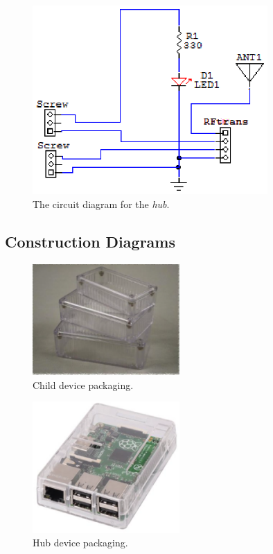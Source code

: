 \documentclass[12pt]{article}
\begin{document}
\begin{figure}[ht!]
\centering %
\includegraphics[width=0.8\textwidth]{CKT-hub.eps} 
\caption{The circuit diagram for the \emph{hub}.} \label{ckt-hub}
\end{figure}

\clearpage

\subsection*{Construction Diagrams}
\begin{figure}[ht!]
\centering %
\includegraphics[width=0.5\textwidth]{child-packaging.eps} 
\caption{Child device packaging. \cite{hammond}} \label{child-pack}
\end{figure}

\begin{figure}[ht!]
\centering %
\includegraphics[width=0.5\textwidth]{hub-packaging.eps} 
\caption{Hub device packaging. \cite{kotek}} \label{hub-pack}
\end{figure}
\end{document}

